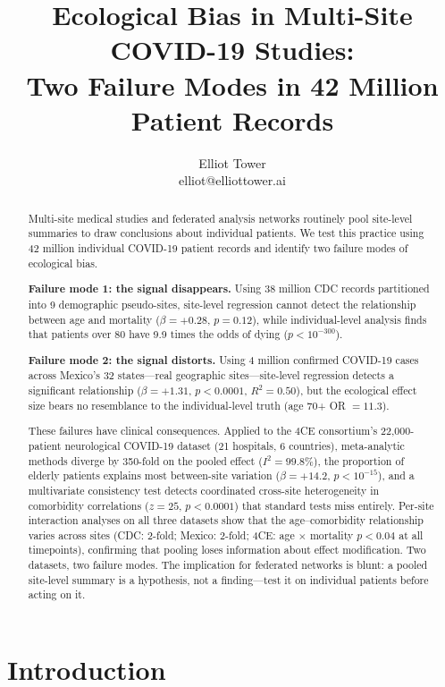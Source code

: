 \documentclass{article}
\title{Ecological Bias in Multi-Site COVID-19 Studies:\\Two Failure Modes in 42 Million Patient Records}
\author{\name Elliot Tower \\
      \email elliot@elliottower.ai}
\begin{document}
\maketitle

\begin{abstract}
Multi-site medical studies and federated analysis networks routinely pool
site-level summaries to draw conclusions about individual patients.  We test
this practice using 42 million individual COVID-19 patient records and
identify two failure modes of ecological bias.

\textbf{Failure mode 1: the signal disappears.}  Using 38 million CDC
records partitioned into 9 demographic pseudo-sites, site-level regression
cannot detect the relationship between age and mortality ($\beta = +0.28$,
$p = 0.12$), while individual-level analysis finds that patients over 80
have 9.9 times the odds of dying ($p < 10^{-300}$).

\textbf{Failure mode 2: the signal distorts.}  Using 4 million confirmed
COVID-19 cases across Mexico's 32 states---real geographic sites---site-level
regression detects a significant relationship ($\beta = +1.31$,
$p < 0.0001$, $R^2 = 0.50$), but the ecological effect size bears no
resemblance to the individual-level truth (age 70+ OR $= 11.3$).

These failures have clinical consequences.  Applied to the 4CE consortium's
22,000-patient neurological COVID-19 dataset (21 hospitals, 6 countries),
meta-analytic methods diverge by 350-fold on the pooled effect
($I^2 = 99.8\%$), the proportion of elderly patients explains most
between-site variation ($\beta = +14.2$, $p < 10^{-15}$), and a
multivariate consistency test detects coordinated cross-site heterogeneity
in comorbidity correlations ($z = 25$, $p < 0.0001$) that standard tests
miss entirely.  Per-site interaction analyses on all three datasets
show that the age--comorbidity relationship varies across sites (CDC:
2-fold; Mexico: 2-fold; 4CE: age $\times$ mortality $p < 0.04$ at all
timepoints), confirming that pooling loses information about effect
modification.  Two datasets, two failure modes.  The implication for federated
networks is blunt: a pooled site-level summary is a hypothesis, not a
finding---test it on individual patients before acting on it.
\end{abstract}


\section{Introduction}
\end{document}
